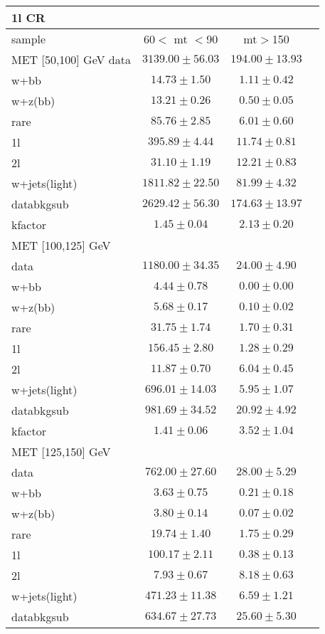 \begin{table}
\begin{center}
\small
\begin{tabular}{lccc}
\hline
1l CR   & &\\
\hline
sample&60$<$ mt $<$90&mt$>$150\\
\hline
MET [50,100] GeV\hline
data&$3139.00\pm56.03$&$194.00\pm13.93$\\
\hline
w+bb&$14.73\pm1.50$&$1.11\pm0.42$\\
w+z(bb)&$13.21\pm0.26$&$0.50\pm0.05$\\
rare&$85.76\pm2.85$&$6.01\pm0.60$\\
1l&$395.89\pm4.44$&$11.74\pm0.81$\\
2l&$31.10\pm1.19$&$12.21\pm0.83$\\
w+jets(light)&$1811.82\pm22.50$&$81.99\pm4.32$\\
\hline
databkgsub&$2629.42\pm56.30$&$174.63\pm13.97$\\
kfactor&$1.45\pm0.04$&$2.13\pm0.20$\\
\hline\hline
\hline
MET [100,125] GeV  & &\\
\hline
data&$1180.00\pm34.35$&$24.00\pm4.90$\\
\hline
w+bb&$4.44\pm0.78$&$0.00\pm0.00$\\
w+z(bb)&$5.68\pm0.17$&$0.10\pm0.02$\\
rare&$31.75\pm1.74$&$1.70\pm0.31$\\
1l&$156.45\pm2.80$&$1.28\pm0.29$\\
2l&$11.87\pm0.70$&$6.04\pm0.45$\\
w+jets(light)&$696.01\pm14.03$&$5.95\pm1.07$\\
\hline
databkgsub&$981.69\pm34.52$&$20.92\pm4.92$\\
kfactor&$1.41\pm0.06$&$3.52\pm1.04$\\
\hline\hline
\hline
MET [125,150] GeV  & &\\
\hline
data&$762.00\pm27.60$&$28.00\pm5.29$\\
\hline
w+bb&$3.63\pm0.75$&$0.21\pm0.18$\\
w+z(bb)&$3.80\pm0.14$&$0.07\pm0.02$\\
rare&$19.74\pm1.40$&$1.75\pm0.29$\\
1l&$100.17\pm2.11$&$0.38\pm0.13$\\
2l&$7.93\pm0.67$&$8.18\pm0.63$\\
w+jets(light)&$471.23\pm11.38$&$6.59\pm1.21$\\
\hline
databkgsub&$634.67\pm27.73$&$25.60\pm5.30$\\

\end{tabular}
\end{center}
\end{table}
